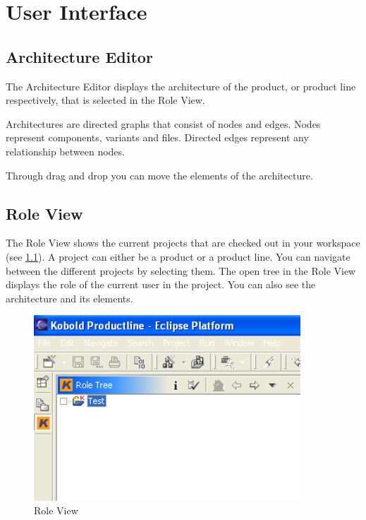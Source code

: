 \chapter{User Interface}

\section{Architecture Editor}

The Architecture Editor displays the architecture of the product,
or product line respectively, that is selected in the Role View. \par

Architectures are directed graphs that consist of nodes and edges. 
Nodes represent components, variants and files. Directed edges represent
any relationship between nodes.\par

Through drag and drop you can move the elements of the architecture.

\section{Role View}

The Role View shows the current projects that are checked out in your workspace 
(see \ref{roletree}).
A project can either be a product or a product line. You can navigate between the 
different projects by selecting them. The open tree in the Role View displays the
role of the current user in the project. You can also see the architecture and its 
elements.

\begin{figure}[h!]
\begin{center}
\includegraphics[width=10cm]{roletree.png}
   \caption{Role View}
\label{roletree}
\end{center}
\end{figure}\par

